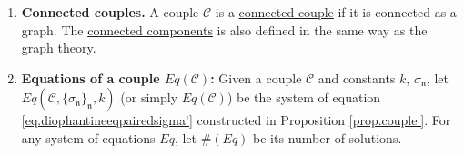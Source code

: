 \begin{defn}\label{def.morecouple}
\begin{enumerate}
    \item \textbf{Connected couples.} A couple $\mathcal{C}$ is a \underline{connected couple} if it is connected as a graph. The \underline{connected components} is also defined in the same way as the graph theory. 
    \item \textbf{Equations of a couple $Eq(\mathcal{C})$:} Given a couple $\mathcal{C}$ and constants $k$, $\sigma_{\mathfrak{n}}$, let $Eq(\mathcal{C},\{\sigma_{\mathfrak{n}}\}_{\mathfrak{n}}, k)$ (or simply $Eq(\mathcal{C})$) be the system of equation \eqref{eq.diophantineeqpairedsigma'} constructed in Proposition \ref{prop.couple'}. For any system of equations $Eq$, let $\#(Eq)$ be its number of solutions.
\end{enumerate}
\end{defn}

